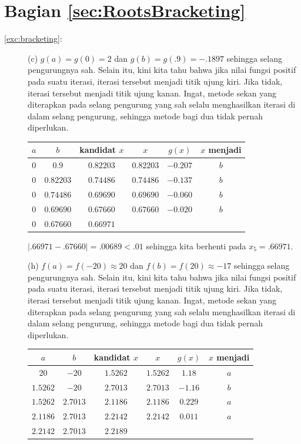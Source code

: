\section*{Bagian \ref{sec:RootsBracketing}}
\begin{description}
\item [{\ref{exc:bracketing}:}] (c) $g(a)=g(0)=2$ dan $g(b)=g(.9)=-.1897$
sehingga selang pengurungnya sah. Selain itu, kini kita tahu bahwa
jika nilai fungsi positif pada suatu iterasi, iterasi tersebut menjadi
titik ujung kiri. Jika tidak, iterasi tersebut menjadi titik ujung
kanan. Ingat, metode sekan yang diterapkan pada selang pengurung yang
sah selalu menghasilkan iterasi di dalam selang pengurung, sehingga
metode bagi dua tidak pernah diperlukan.

\begin{center}
\begin{tabular}{cccccc}
$a$ & $b$ & kandidat $x$ & $x$ & $g(x)$ & $x$ menjadi\tabularnewline
\hline 
$0$ & $0.9$ & $0.82203$ & $0.82203$ & $-0.207$ & $b$\tabularnewline
$0$ & $0.82203$ & $0.74486$ & $0.74486$ & $-0.137$ & $b$\tabularnewline
$0$ & $0.74486$ & $0.69690$ & $0.69690$ & $-0.060$ & $b$\tabularnewline
$0$ & $0.69690$ & $0.67660$ & $0.67660$ & $-0.020$ & $b$\tabularnewline
$0$ & $0.67660$ & $0.66971$ &  &  & \tabularnewline
\end{tabular}
\par\end{center}

$|.66971-.67660|=.00689<.01$ sehingga kita berhenti pada $x_{5}=.66971$.

(h) $f(a)=f(-20)\approx20$ dan $f(b)=f(20)\approx-17$ sehingga selang
pengurungnya sah. Selain itu, kini kita tahu bahwa jika nilai fungsi
positif pada suatu iterasi, iterasi tersebut menjadi titik ujung kiri.
Jika tidak, iterasi tersebut menjadi titik ujung kanan. Ingat, metode
sekan yang diterapkan pada selang pengurung yang sah selalu menghasilkan
iterasi di dalam selang pengurung, sehingga metode bagi dua tidak
pernah diperlukan.

\begin{center}
\begin{tabular}{cccccc}
$a$ & $b$ & kandidat $x$ & $x$ & $g(x)$ & $x$ menjadi\tabularnewline
\hline 
$20$ & $-20$ & $1.5262$ & $1.5262$ & $1.18$ & $a$\tabularnewline
$1.5262$ & $-20$ & $2.7013$ & $2.7013$ & $-1.16$ & $b$\tabularnewline
$1.5262$ & $2.7013$ & $2.1186$ & $2.1186$ & $0.229$ & $a$\tabularnewline
$2.1186$ & $2.7013$ & $2.2142$ & $2.2142$ & $0.011$ & $a$\tabularnewline
$2.2142$ & $2.7013$ & $2.2189$ &  &  & \tabularnewline
\end{tabular}
\par\end{center}


\end{description}
